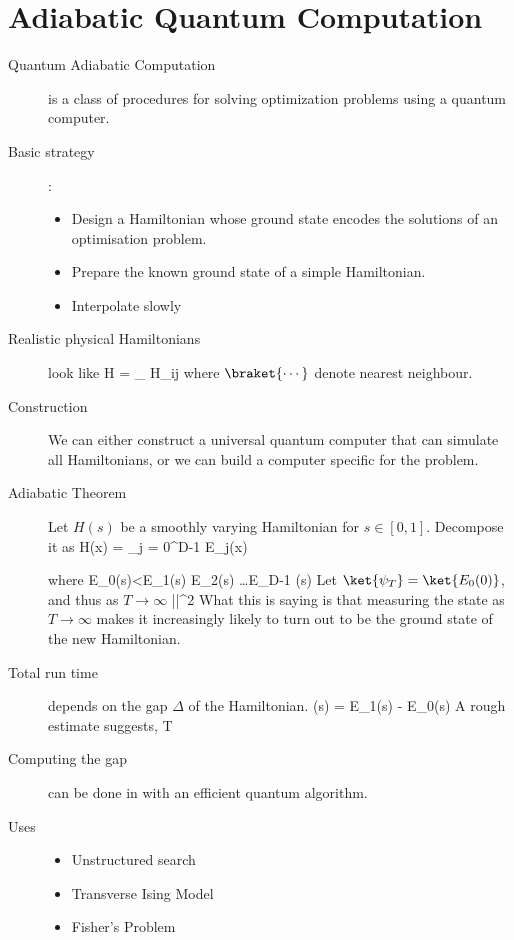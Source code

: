 \section{Adiabatic Quantum Computation}
\begin{description}
\item[Quantum Adiabatic Computation] is a class of procedures for solving optimization problems using a quantum computer. 

\item[Basic strategy]:
\begin{itemize}
\item Design a Hamiltonian whose ground state encodes the solutions of an optimisation problem. 
\item Prepare the known ground state of a simple Hamiltonian. 
\item Interpolate slowly
\end{itemize}

\item[Realistic physical Hamiltonians] look like
\beq
H = \sum_{} H_{ij}
\eeq
where $\braket{\cdots}$ denote nearest neighbour. 

\item[Construction] We can either construct a universal quantum computer that can simulate all Hamiltonians, or we can build a computer specific for the problem. 

\item[Adiabatic Theorem] Let $H(s)$ be a smoothly varying Hamiltonian for $s \in [0,1]$. Decompose it as
\beq
H(x) = \sum_{j = 0}^{D-1} E_j(x) 
\eeq

where 
\beq
E_0(s)<E_1(s) \leq E_2(s) \leq \ldots \leq E_{D-1} (s)
\eeq
Let $\ket{\psi_T} =\ket{E_0(0)}$, and thus as $T \rightarrow \infty$
\beq
||^2 
\eeq
What this is saying is that measuring the state as $T \rightarrow \infty$ makes it increasingly likely to turn out to be the ground state of the new Hamiltonian. 

\item[Total run time] depends on the gap $\Delta$ of the Hamiltonian. 
\beq
\Delta (s) = E_1(s) - E_0(s)
\eeq
A rough estimate suggests, 
\beq
T \gg {}
\eeq


\item[Computing the gap] can be done in 
\beq
\geq {}
\eeq
with an efficient quantum algorithm. 

\item[Uses]
\begin{itemize}
\item Unstructured search
\item Transverse Ising Model
\item Fisher's Problem
\end{itemize}


\end{description}
